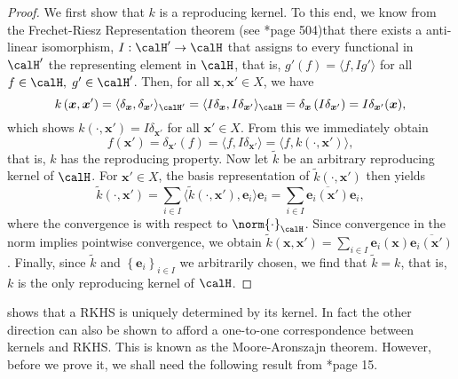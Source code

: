 \begin{proof}
    We first show that $k$ is a reproducing kernel. To this end, we know from the Frechet-Riesz Representation theorem (see \cite{SteinwartIngo2008SVMb}*{page 504})that there exists a anti-linear isomorphism, $I : \calH' \to \calH$ that assigns to every functional in $\calH'$ the representing element in $\calH$, that is, $g'(f) = \langle f , I g' \rangle$ for all $f \in \calH, \; g' \in \calH'$. Then, for all $\bm{x} , \bm{x}' \in X$, we have
    \begin{equation*}
        k \left( \bm{x} , \bm{x}' \right) = \langle \delta_{\bm{x}} , \delta_{\bm{x}'} \rangle_{\calH'} = \langle I \delta_{\bm{x}} , I \delta_{\bm{x}'} \rangle_{\calH} = \delta_{\bm{x}} \left( I \delta_{\bm{x}'} \right) = I \delta_{\bm{x}'} (\bm{x}),
    \end{equation*}
    which shows $k \left( \cdot , \bm{x}' \right) = I \delta_{\bm{x}'}$ for all $\bm{x}' \in X$. From this we immediately obtain
    \begin{equation*}
        f(\bm{x}') = \delta_{\bm{x}'} (f) = \langle f , I \delta_{\bm{x}'} \rangle = \langle f , k \left( \cdot , \bm{x}' \right) \rangle,
    \end{equation*}
    that is, $k$ has the reproducing property. Now let $\tilde{k}$ be an arbitrary reproducing kernel of $\calH$. For $\bm{x}' \in X$, the basis representation of $\tilde{k} \left( \cdot , \bm{x}' \right)$ then yields
    \begin{equation*}
        \tilde{k} \left( \cdot , \bm{x}' \right) = \sum_{i \in I} \langle \tilde{k} (\cdot , \bm{x}'), \bm{e}_{i} \rangle \bm{e}_{i} = \sum_{i \in I} \overline{\bm{e}_{i} (\bm{x}')} \bm{e}_{i},
    \end{equation*}
    where the convergence is with respect to $\norm{\cdot}_{\calH}$. Since convergence in the norm implies pointwise convergence, we obtain $\tilde{k} \left( \bm{x} , \bm{x}' \right) = \sum_{i \in I} \bm{e}_{i} (\bm{x}) \overline{\bm{e}_{i} (\bm{x}')}$. Finally, since $\tilde{k}$ and $\left\{ \bm{e}_{i} \right\}_{i\in I}$ we arbitrarily chosen, we find that $\tilde{k} = k$, that is, $k$ is the only reproducing kernel of $\calH$.
\end{proof}

 shows that a RKHS is uniquely determined by its kernel. In fact the other direction can also be shown to afford a one-to-one correspondence between kernels and RKHS. This is known as the Moore-Aronszajn theorem. However, before we prove it, we shall need the following result from \cite{BerlinetAlain2003RKHS}*{page 15}.


